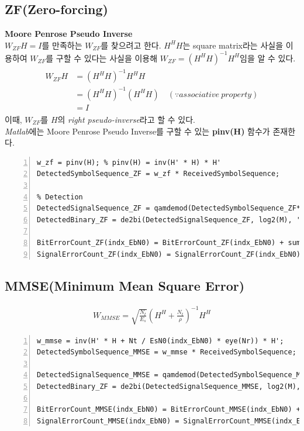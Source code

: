 \documentclass{article}
\newcommand{\bd}{\textbf} %
\begin{document}
\subsection{ZF(Zero-forcing)}
\bd{Moore Penrose Pseudo Inverse}\\
$W_{ZF}H=I$를 만족하는 $W_{ZF}$를 찾으려고 한다. $H^H H$는 square matrix라는 사실을 이용하여 $W_{ZF}$를 구할 수 있다는 사실을 이용해 $W_{ZF}=(H^H H)^{-1}H^H$임을 알 수 있다.
\begin{gather}
	\begin{split}
		W_{ZF}H&=(H^H H)^{-1}H^H H\\
		&=(H^H H)^{-1}(H^H H) \quad (\because associative\ property)\\
		&=I
	\end{split}
\end{gather}
이때, $W_{ZF}$를 $H$의 \textsl{right pseudo-inverse}라고 할 수 있다.\\
\textsl{Matlab}에는 Moore Penrose Pseudo Inverse를 구할 수 있는 \bd{pinv(H)} 함수가 존재한다.
\begin{lstlisting}[style=Matlab-editor, frame=single, numbers=left,]
% ZF Receiver
w_zf = pinv(H); % pinv(H) = inv(H' * H) * H'
DetectedSymbolSequence_ZF = w_zf * ReceivedSymbolSequence;

% Detection
DetectedSignalSequence_ZF = qamdemod(DetectedSymbolSequence_ZF*NormalizationFactor, M);
DetectedBinary_ZF = de2bi(DetectedSignalSequence_ZF, log2(M), 'left-msb');

BitErrorCount_ZF(indx_EbN0) = BitErrorCount_ZF(indx_EbN0) + sum(SignalBinary~=DetectedBinary_ZF, 'all');
SignalErrorCount_ZF(indx_EbN0) = SignalErrorCount_ZF(indx_EbN0) + sum(SignalSequence~=DetectedSignalSequence_ZF, 'all');
\end{lstlisting}
\subsection{MMSE(Minimum Mean Square Error)}
\begin{gather}
	W_{MMSE}=\sqrt{\frac{N_t}{E_s}}(H^H+\frac{N_t}{\rho})^{-1}H^H
\end{gather}
\begin{lstlisting}[style=Matlab-editor, frame=single, numbers=left,]
% MMSE Receiver
w_mmse = inv(H' * H + Nt / EsN0(indx_EbN0) * eye(Nr)) * H';
DetectedSymbolSequence_MMSE = w_mmse * ReceivedSymbolSequence; % Detection (Zero-Forcing: y / h)

DetectedSignalSequence_MMSE = qamdemod(DetectedSymbolSequence_MMSE*NormalizationFactor, M); % Detection
DetectedBinary_ZF = de2bi(DetectedSignalSequence_MMSE, log2(M), 'left-msb');

BitErrorCount_MMSE(indx_EbN0) = BitErrorCount_MMSE(indx_EbN0) + sum(SignalBinary~=DetectedBinary_ZF, 'all');
SignalErrorCount_MMSE(indx_EbN0) = SignalErrorCount_MMSE(indx_EbN0) + sum(SignalSequence~=DetectedSignalSequence_MMSE, 'all');
\end{lstlisting}
\end{document}
